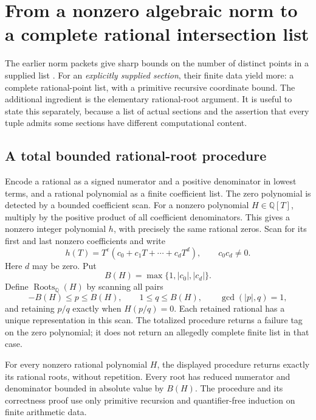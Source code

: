 \section{From a nonzero algebraic norm to a complete rational intersection list}
\label{sec:norm-enumeration}

The earlier norm packets give sharp bounds on the number of distinct
points in a supplied list \cite{Demand,Coherent}. For an \emph{explicitly supplied section},
their finite data yield more: a complete rational-point list, with a
primitive recursive coordinate bound.  The additional ingredient is
the elementary rational-root argument.  It is useful to state this
separately, because a list of actual sections and the assertion that
every tuple admits some sections have different computational content.

\subsection{A total bounded rational-root procedure}

Encode a rational as a signed numerator and a positive denominator in
lowest terms, and a rational polynomial as a finite coefficient list.
The zero polynomial is detected by a bounded coefficient scan.
For a nonzero polynomial \(H\in\mathbb Q[T]\), multiply by the positive
product of all coefficient denominators.  This gives a nonzero integer
polynomial \(h\), with precisely the same rational zeros.  Scan for its
first and last nonzero coefficients and write
\[
 h(T)=T^e(c_0+c_1T+\cdots+c_dT^d),
 \qquad c_0c_d\ne0.
\]
Here \(d\) may be zero.  Put
\[
 B(H)=\max\{1,|c_0|,|c_d|\}.
 \tag{RR1}\label{eq:norm-root-bound}
\]
Define \(\operatorname{Roots}_{\mathbb Q}(H)\) by scanning all pairs
\[
 -B(H)\le p\le B(H),\qquad 1\le q\le B(H),\qquad
 \gcd(|p|,q)=1,
\]
and retaining \(p/q\) exactly when \(H(p/q)=0\).  Each retained
rational has a unique representation in this scan.  The totalized
procedure returns a failure tag on the zero polynomial; it does not
return an allegedly complete finite list in that case.

\begin{lemma}\label{lem:norm-rational-roots}
For every nonzero rational polynomial \(H\), the displayed procedure
returns exactly its rational roots, without repetition.  Every root
has reduced numerator and denominator bounded in absolute value by
\(B(H)\).  The procedure and its correctness proof use only primitive
recursion and quantifier-free induction on finite arithmetic data.
\end{lemma}


